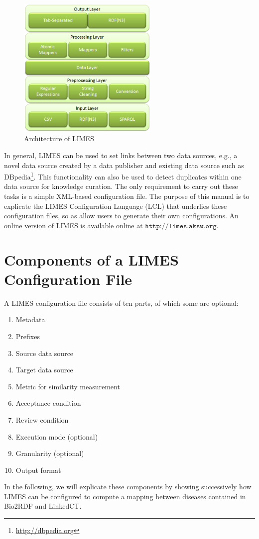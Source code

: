 \documentclass[a4paper, 11pt]{article}
\begin{document}
\begin{figure}[ht!]
      \centering
      \includegraphics[width = 0.6\textwidth]{images/architecture.png}
      \caption{Architecture of LIMES}
      \label{fig:architecture}
    \end{figure}

In general, LIMES can be used to set links between two data sources, e.g., a novel data source created by a data publisher and existing data source such as DBpedia\footnote{\url{http://dbpedia.org}}. This functionality can also be used to detect duplicates within one data source for knowledge curation. The only requirement to carry out these tasks is a simple XML-based configuration file. The purpose of this manual is to explicate the LIMES Configuration Language (LCL) that underlies these configuration files, so as allow users to generate their own configurations. An online version of LIMES is available online at $\texttt{http://limes.aksw.org}$.

\section{Components of a LIMES Configuration File}
A LIMES configuration file consists of ten parts, of which some are optional:
\begin{enumerate}
\item Metadata
\item Prefixes
\item Source data source
\item Target data source
\item Metric for similarity measurement
\item Acceptance condition
\item Review condition
\item Execution mode (optional)
\item Granularity (optional)
\item Output format
\end{enumerate}
In the following, we will explicate these components by showing successively how LIMES can be configured to compute a mapping between diseases contained in Bio2RDF and LinkedCT.
\end{document}
